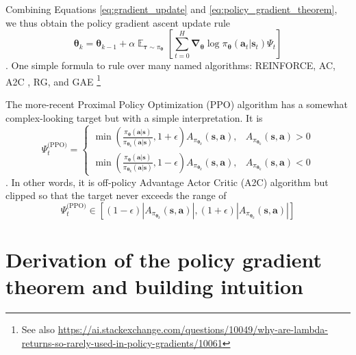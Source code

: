 \documentclass{article}
\begin{document}
Combining Equations \ref{eq:gradient_update} and \ref{eq:policy_gradient_theorem}, we thus obtain the policy gradient ascent update rule
\begin{equation}\label{eq:policty_gradient_update}
\boldsymbol{\theta}_{k}=\boldsymbol{\theta}_{k-1}+\alpha \mathop{\mathbb{E}}_{\boldsymbol{\tau}\sim\pi_{\boldsymbol{\theta}}}\left[\sum_{t=0}^H\boldsymbol{\nabla}_{\boldsymbol{\theta}}\log\pi_{\boldsymbol{\theta}}(\mathbf{a}_t|\mathbf{s}_t)\Psi_t\right]
\end{equation}. One simple formula to rule over many named algorithms: REINFORCE\cite{REINFORCE}, AC\cite{AC}, A2C \cite{A3C}, RG, and  GAE \cite{GAE}\footnote{See also \url{https://ai.stackexchange.com/questions/10049/why-are-lambda-returns-so-rarely-used-in-policy-gradients/10061}}


The more-recent Proximal Policy Optimization (PPO) algorithm\cite{ppo} has a somewhat complex-looking target but with a simple interpretation. It is \begin{equation}\Psi_t^\text{(PPO)}=\begin{cases}\min\left(\frac{\pi_{\boldsymbol{\theta}}(\mathbf{a}|\mathbf{s})}{\pi_{\boldsymbol{\theta}_k}(\mathbf{a}|\mathbf{s})},1+\epsilon\right)A_{\pi_{\boldsymbol{\theta}_k}}(\mathbf{s},\mathbf{a}), &A_{\pi_{\boldsymbol{\theta}_k}}(\mathbf{s},\mathbf{a})>0\\\min\left(\frac{\pi_{\boldsymbol{\theta}}(\mathbf{a}|\mathbf{s})}{\pi_{\boldsymbol{\theta}_k}(\mathbf{a}|\mathbf{s})},1-\epsilon\right)A_{\pi_{\boldsymbol{\theta}_k}}(\mathbf{s},\mathbf{a}), &A_{\pi_{\boldsymbol{\theta}_k}}(\mathbf{s},\mathbf{a})<0\end{cases}\end{equation}. In other words, it is off-policy Advantage Actor Critic (A2C) algorithm but clipped so that the target never exceeds the range of \begin{equation}\Psi_t^\text{(PPO)}\in\left[(1-\epsilon)\left|A_{\pi_{\boldsymbol{\theta}_k}}(\mathbf{s},\mathbf{a})\right|,(1+\epsilon)\left|A_{\pi_{\boldsymbol{\theta}_k}}(\mathbf{s},\mathbf{a})\right|\right] \end{equation}

\section{Derivation of the policy gradient theorem and building intuition}
\end{document}
